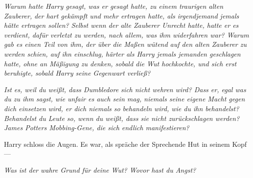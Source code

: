 \emph{Warum hatte Harry gesagt, was er gesagt hatte, zu einem traurigen alten Zauberer,} \emph{der hart gekämpft und mehr ertragen hatte, als irgendjemand jemals hätte ertragen sollen?} \emph{Selbst wenn der alte Zauberer Unrecht hatte, hatte er es verdient, dafür verletzt zu werden, nach allem, was ihm widerfahren war? Warum gab es einen Teil von ihm, der über die Maßen wütend auf den alten Zauberer zu werden schien, auf ihn einschlug, härter als Harry jemals jemanden geschlagen hatte, ohne an Mäßigung zu denken, sobald die Wut hochkochte, und sich erst beruhigte, sobald Harry seine Gegenwart verließ?}

\emph{Ist es, weil du weißt, dass Dumbledore sich nicht wehren wird? Dass er, egal was du zu ihm sagst, wie unfair es auch sein mag, niemals seine eigene Macht gegen dich einsetzen wird, er dich niemals so behandeln wird, wie du ihn behandelst? Behandelst du Leute so, wenn du weißt, dass sie nicht zurückschlagen werden? James Potters Mobbing-Gene, die sich endlich manifestieren?}

Harry schloss die Augen.
%
Es war, als spräche der Sprechende Hut in seinem Kopf —


\emph{Was ist der wahre Grund für deine Wut? Wovor hast du Angst?}


